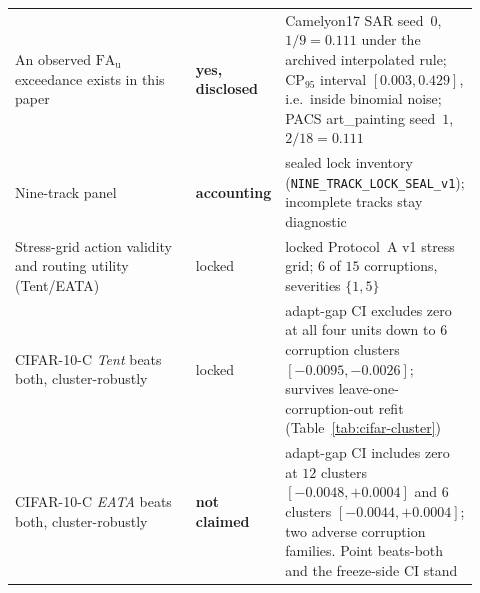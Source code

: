 \begin{center}
\begin{tabular}{@{}p{0.40\linewidth}p{0.14\linewidth}p{0.38\linewidth}@{}}
An observed $\mathrm{FA}_{\mathrm u}$ exceedance exists in this paper & \textbf{yes, disclosed} & Camelyon17 SAR seed~$0$, $1/9=0.111$ under the archived interpolated rule; CP$_{95}$ interval $[0.003,0.429]$, i.e.\ inside binomial noise; PACS art\_painting seed~$1$, $2/18=0.111$ \\
Nine-track panel & \textbf{accounting} & sealed lock inventory (\texttt{NINE\_TRACK\_LOCK\_SEAL\_v1}); incomplete tracks stay diagnostic \\
Stress-grid action validity and routing utility (Tent/EATA) & locked & locked Protocol~A v1 stress grid; $6$ of $15$ corruptions, severities $\{1,5\}$ \\
CIFAR-10-C \emph{Tent} beats both, cluster-robustly & locked & adapt-gap CI excludes zero at all four units down to $6$ corruption clusters $[-0.0095,-0.0026]$; survives leave-one-corruption-out refit (Table~\ref{tab:cifar-cluster}) \\
CIFAR-10-C \emph{EATA} beats both, cluster-robustly & \textbf{not claimed} & adapt-gap CI includes zero at $12$ clusters $[-0.0048,+0.0004]$ and $6$ clusters $[-0.0044,+0.0004]$; two adverse corruption families. Point beats-both and the freeze-side CI stand \\
\bottomrule
\end{tabular}
\end{center}

